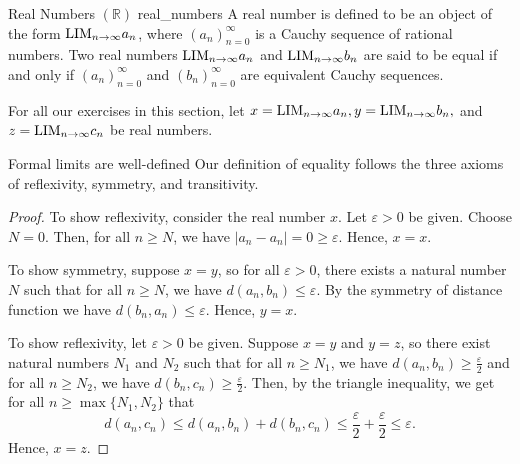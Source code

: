 \begin{definition}{Real Numbers $(\mathbb{R})$ }{real_numbers}
    A real number is defined to be an object of the form $\text{LIM}_{n \to \infty} a_n$, where $(a_n)_{n=0}^\infty$ is a Cauchy sequence of rational numbers.
    Two real numbers $\text{LIM}_{n \to \infty} a_n$ and $\text{LIM}_{n \to \infty} b_n$ are said to be equal if and only if $(a_n)_{n=0}^\infty$ and $(b_n)_{n=0}^\infty$ are equivalent Cauchy sequences.
\end{definition}

For all our exercises in this section, let $x = \text{LIM}_{n \to \infty} a_n, y = \text{LIM}_{n \to \infty} b_n,$ and $z = \text{LIM}_{n \to \infty} c_n$ be real numbers.

\begin{problem}{Formal limits are well-defined}
    Our definition of equality follows the three axioms of reflexivity, symmetry, and transitivity.
\end{problem}

\begin{proof}
    To show reflexivity, consider the real number $x$. 
    Let $\varepsilon > 0$ be given. 
    Choose $N = 0.$ 
    Then, for all $n \geq N$, we have $|a_n - a_n| = 0 \geq \varepsilon.$
    Hence, $x = x.$

    To show symmetry, suppose $x = y$, so for all $\varepsilon > 0$, there exists a natural number $N$ such that for all $n \geq N$, we have $d(a_n, b_n) \leq \varepsilon.$
    By the symmetry of distance function we have $d(b_n, a_n) \leq \varepsilon$. Hence, $y = x.$

    To show reflexivity, let $\varepsilon > 0$ be given. 
    Suppose $x = y$ and $y = z$, 
    so there exist natural numbers $N_1$ and $N_2$ 
    such that for all $n \geq N_1$, we have $d(a_n, b_n) \geq \frac{\varepsilon}{2}$ 
    and for all $n \geq N_2$, we have $d(b_n, c_n) \geq \frac{\varepsilon}{2}$.
    Then, by the triangle inequality, we get for all $n \geq \max \{ N_1, N_2 \}$ that
    $$d(a_n, c_n) \leq d(a_n, b_n) + d(b_n, c_n) \leq \frac{\varepsilon}{2} + \frac{\varepsilon}{2} \leq \varepsilon.$$
    Hence, $x = z.$
\end{proof}

